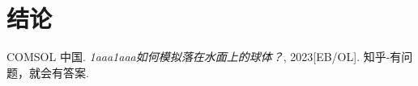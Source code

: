 \documentclass[a4paper,12pt，twoside]{ctexart}
\begin{document}
	\section*{结论}
	
	
	
	
	\newpage
	\begin{thebibliography}{10}  
		COMSOL 中国. \textit{1aaa}\emph{1aaa如何模拟落在水面上的球体？}, 2023[EB/OL]. 知乎-有问题，就会有答案.
		
	\end{thebibliography}
	
	
	
	
	
	
\end{document}
